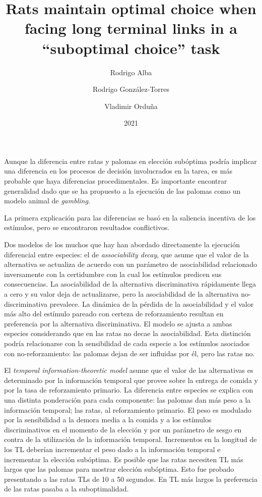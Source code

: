 \documentclass[a4paper,12pt]{article}
\title{Rats maintain optimal choice when facing long terminal links in a ``suboptimal choice'' task}
\author{Rodrigo Alba \and Rodrigo González-Torres \and Vladimir Orduña}
\date{2021}
\begin{document}
{\scshape\bfseries \maketitle}

Aunque la diferencia entre ratas  y palomas en elección subóptima podría implicar una diferencia en los procesos de decisión involucrados en la tarea, es más probable que haya diferencias procedimentales. Es importante encontrar generalidad dado que se ha propuesto a la ejecución de las palomas como un modelo animal de {\itshape gambling}.

La primera explicación para las diferencias se basó en la saliencia incentiva de los estímulos, pero se encontraron resultados conflictivos.

Dos modelos de los muchos que hay han abordado directamente la ejecución diferencial entre especies: el de {\itshape associability decay}, que asume que el valor de la alternativa se actualiza de acuerdo con un parámetro de asociabilidad relacionado inversamente con la certidumbre con la cual los estímulos predicen sus consecuencias. La asociabilidad de la alternativa discriminativa rápidamente llega a cero y su valor deja de actualizarse, pero la asociabilidad de la alternativa no-discriminativa prevalece. La dinámica de la pérdida de la asociabilidad y el valor más alto del estímulo pareado con certeza de reforzamiento resultan en preferencia por la alternativa discriminativa. El modelo se ajusta a ambas especies considerando que en las ratas no decae la asociabilidad. Esta distinción podría relacionarse con la sensibilidad de cada especie a los estímulos asociados con no-reforzamiento: las palomas dejan de ser influidas por él, pero las ratas no.

El {\itshape temporal information-theoretic model} asume que el valor de las alternativas es determinado por la información temporal que provee sobre la entrega de comida y por la tasa de reforzamiento primario. La diferencia entre especies se explica con una distinta ponderación para cada componente: las palomas dan más peso a la información temporal; las ratas, al reforzamiento primario. El peso es modulado por la sensibilidad a la demora media a la comida y a los estímulos discriminativos en el momento de la elección y por un parámetro de sesgo en contra de la utilización de la información temporal. Incrementos en la longitud de los TL deberían incrementar el peso dado a la información temporal e incrementar la elección subóptima. Es posible que las ratas necesiten TL más largos que las palomas para mostrar elección subóptima. Esto fue probado presentando a las ratas TLs de 10 a 50 segundos. En TL más largos la preferencia de las ratas pasaba a la suboptimalidad.
\end{document}
